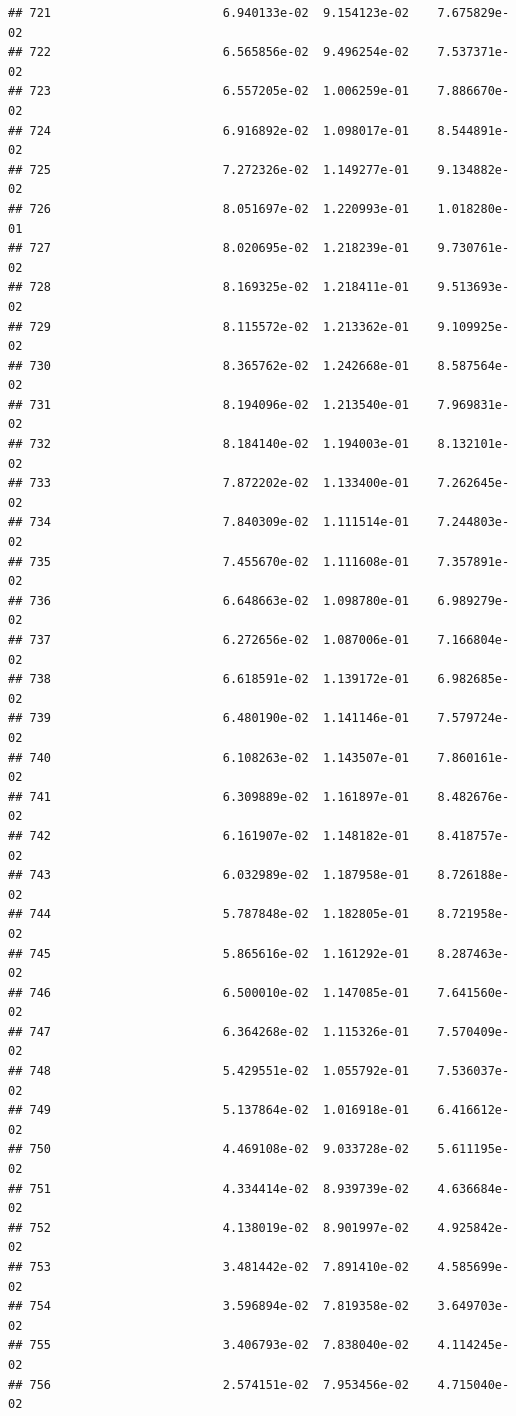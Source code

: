 \documentclass[
]{article}
\begin{document}
\begin{verbatim}
## 721                        6.940133e-02  9.154123e-02    7.675829e-02
## 722                        6.565856e-02  9.496254e-02    7.537371e-02
## 723                        6.557205e-02  1.006259e-01    7.886670e-02
## 724                        6.916892e-02  1.098017e-01    8.544891e-02
## 725                        7.272326e-02  1.149277e-01    9.134882e-02
## 726                        8.051697e-02  1.220993e-01    1.018280e-01
## 727                        8.020695e-02  1.218239e-01    9.730761e-02
## 728                        8.169325e-02  1.218411e-01    9.513693e-02
## 729                        8.115572e-02  1.213362e-01    9.109925e-02
## 730                        8.365762e-02  1.242668e-01    8.587564e-02
## 731                        8.194096e-02  1.213540e-01    7.969831e-02
## 732                        8.184140e-02  1.194003e-01    8.132101e-02
## 733                        7.872202e-02  1.133400e-01    7.262645e-02
## 734                        7.840309e-02  1.111514e-01    7.244803e-02
## 735                        7.455670e-02  1.111608e-01    7.357891e-02
## 736                        6.648663e-02  1.098780e-01    6.989279e-02
## 737                        6.272656e-02  1.087006e-01    7.166804e-02
## 738                        6.618591e-02  1.139172e-01    6.982685e-02
## 739                        6.480190e-02  1.141146e-01    7.579724e-02
## 740                        6.108263e-02  1.143507e-01    7.860161e-02
## 741                        6.309889e-02  1.161897e-01    8.482676e-02
## 742                        6.161907e-02  1.148182e-01    8.418757e-02
## 743                        6.032989e-02  1.187958e-01    8.726188e-02
## 744                        5.787848e-02  1.182805e-01    8.721958e-02
## 745                        5.865616e-02  1.161292e-01    8.287463e-02
## 746                        6.500010e-02  1.147085e-01    7.641560e-02
## 747                        6.364268e-02  1.115326e-01    7.570409e-02
## 748                        5.429551e-02  1.055792e-01    7.536037e-02
## 749                        5.137864e-02  1.016918e-01    6.416612e-02
## 750                        4.469108e-02  9.033728e-02    5.611195e-02
## 751                        4.334414e-02  8.939739e-02    4.636684e-02
## 752                        4.138019e-02  8.901997e-02    4.925842e-02
## 753                        3.481442e-02  7.891410e-02    4.585699e-02
## 754                        3.596894e-02  7.819358e-02    3.649703e-02
## 755                        3.406793e-02  7.838040e-02    4.114245e-02
## 756                        2.574151e-02  7.953456e-02    4.715040e-02

\end{verbatim}
\end{document}
